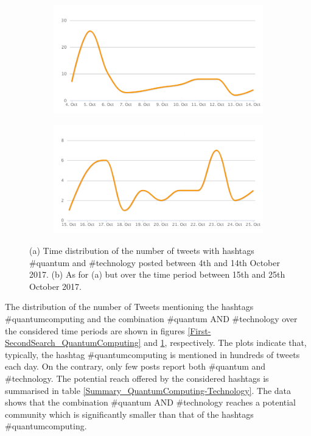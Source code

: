 \begin{figure}
 \centering
 \begin{subfigure}[b]{0.9\textwidth}
   \includegraphics[width=1\linewidth]{Images/FirstSearch_QuantumTechnology.png}
   \caption{} 
 \end{subfigure}

 \begin{subfigure}[b]{0.9\textwidth}
   \includegraphics[width=1\linewidth]{Images/SecondSearch_QuantumTechnology.png}
   \caption{}
 \end{subfigure}
 \caption{(a) Time distribution of the number of tweets with hashtags \#quantum and \#technology posted between 4th and 14th October 2017. (b) As for (a) but over the time period between 15th and 25th October 2017.} 
 \label{First-SecondSearch_QuantumTechnology}
\end{figure}

The distribution of the number of Tweets mentioning the hashtags \#quantumcomputing and the combination \#quantum AND \#technology over the considered time periods are shown in figures \ref{First-SecondSearch_QuantumComputing} and \ref{First-SecondSearch_QuantumTechnology}, respectively. The plots indicate that, typically, the hashtag \#quantumcomputing is mentioned in hundreds of tweets each day. On the contrary, only few posts report both \#quantum and \#technology. The potential reach offered by the considered hashtags is summarised in table \ref{Summary_QuantumComputing-Technology}. The data shows that the combination \#quantum AND \#technology reaches a potential community which is significantly smaller than that of the hashtags \#quantumcomputing. 

